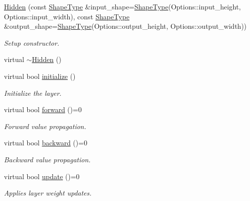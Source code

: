 \begin{DoxyCompactItemize}
\item 
\hyperlink{classffnn_1_1layer_1_1_hidden_ae87f0ac803b0f889823deeb80c3124c5}{Hidden} (const \hyperlink{classffnn_1_1layer_1_1_hidden_a567e902299b3355501393cf6c7b27c38}{Shape\-Type} \&input\-\_\-shape=\hyperlink{classffnn_1_1layer_1_1_hidden_a567e902299b3355501393cf6c7b27c38}{Shape\-Type}(Options\-::input\-\_\-height, Options\-::input\-\_\-width), const \hyperlink{classffnn_1_1layer_1_1_hidden_a567e902299b3355501393cf6c7b27c38}{Shape\-Type} \&output\-\_\-shape=\hyperlink{classffnn_1_1layer_1_1_hidden_a567e902299b3355501393cf6c7b27c38}{Shape\-Type}(Options\-::output\-\_\-height, Options\-::output\-\_\-width))
\begin{DoxyCompactList}\small\item\em Setup constructor. \end{DoxyCompactList}\item 
virtual \hyperlink{classffnn_1_1layer_1_1_hidden_aa4453b6032e969b3cc31eb7f083d2359}{$\sim$\-Hidden} ()
\item 
virtual bool \hyperlink{classffnn_1_1layer_1_1_hidden_a50b9141e7d96fb7c6a1a6418fb204d92}{initialize} ()
\begin{DoxyCompactList}\small\item\em Initialize the layer. \end{DoxyCompactList}\item 
virtual bool \hyperlink{classffnn_1_1layer_1_1_hidden_aba6a84a760d66acec2e6e67c29a67f5b}{forward} ()=0
\begin{DoxyCompactList}\small\item\em Forward value propagation. \end{DoxyCompactList}\item 
virtual bool \hyperlink{classffnn_1_1layer_1_1_hidden_ac26b0c21f2d47b06b6ecba0211bb696e}{backward} ()=0
\begin{DoxyCompactList}\small\item\em Backward value propagation. \end{DoxyCompactList}\item 
virtual bool \hyperlink{classffnn_1_1layer_1_1_hidden_ac95dceacf1a0ea65674fb269a48730fb}{update} ()=0
\begin{DoxyCompactList}\small\item\em Applies layer weight updates. \end{DoxyCompactList}\end{DoxyCompactItemize}
